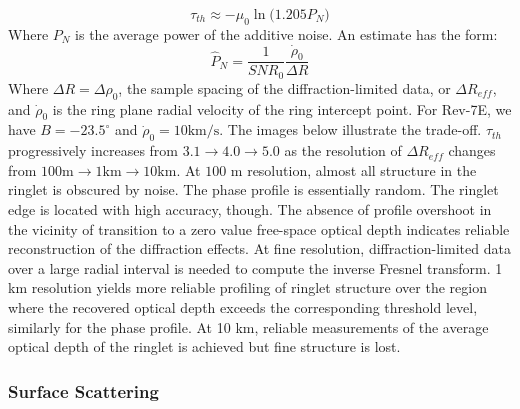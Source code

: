 \documentclass[oneside]{book}
\theoremstyle{mystyle}
\begin{document}
\begin{equation}
\tau_{th} \approx -\mu_0\ln\big(1.205 P_N\big)
\end{equation}
Where $P_N$ is the average power of the additive noise. An estimate has the form:
\begin{equation}
\hat{P}_N = \frac{1}{SNR_0}\frac{\dot{\rho}_0}{\Delta R}
\end{equation}
Where $\Delta R = \Delta \rho_0$, the sample spacing of the diffraction-limited data, or $\Delta R_{eff}$, and $\dot{\rho}_0$ is the ring plane radial velocity of the ring intercept point. For Rev-7E, we have $B = -23.5^{\circ}$ and $\dot{\rho}_0 = 10 \textrm{km/s}$. The images below illustrate the trade-off. $\tau_{th}$ progressively increases from $3.1\rightarrow 4.0 \rightarrow 5.0$ as the resolution of $\Delta R_{eff}$ changes from $100\textrm{m}\rightarrow 1\textrm{km}\rightarrow 10\textrm{km}$. At $100$ m resolution, almost all structure in the ringlet is obscured by noise. The phase profile is essentially random. The ringlet edge is located with high accuracy, though. The absence of profile overshoot in the vicinity of transition to a zero value free-space optical depth indicates reliable reconstruction of the diffraction effects. At fine resolution, diffraction-limited data over a large radial interval is needed to compute the inverse Fresnel transform. 1 km resolution yields more reliable profiling of ringlet structure over the region where the recovered optical depth exceeds the corresponding threshold level, similarly for the phase profile. At 10 km, reliable measurements of the average optical depth of the ringlet is achieved but fine structure is lost. 

\subsubsection{Surface Scattering}
\end{document}
